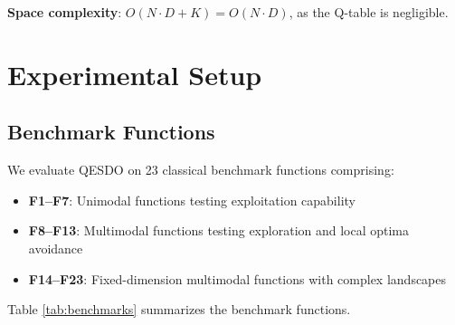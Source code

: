 \documentclass[preprint,12pt]{elsarticle}
\begin{document}
\textbf{Space complexity}: $O(N \cdot D + K) = O(N \cdot D)$, as the Q-table is negligible.

\section{Experimental Setup}
\label{sec:experiments}

\subsection{Benchmark Functions}
\label{subsec:benchmarks}

We evaluate QESDO on 23 classical benchmark functions comprising:
\begin{itemize}
    \item \textbf{F1--F7}: Unimodal functions testing exploitation capability
    \item \textbf{F8--F13}: Multimodal functions testing exploration and local optima avoidance
    \item \textbf{F14--F23}: Fixed-dimension multimodal functions with complex landscapes
\end{itemize}

Table \ref{tab:benchmarks} summarizes the benchmark functions.
\end{document}
